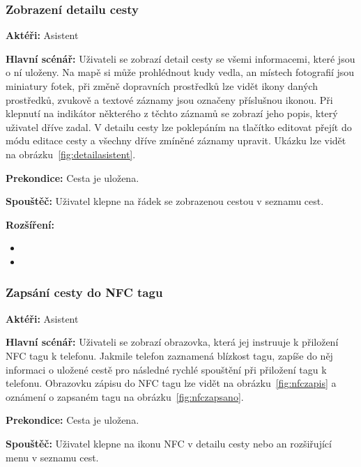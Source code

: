 \documentclass{article}
\newcommand{\usecase}[2]{\subsubsection{#1}\label{#2}}
\begin{document}
\usecase{Zobrazení detailu cesty}{detailasistent}
\textbf{Aktéři:} Asistent

\vspace{0.1cm}
\noindent
\textbf{Hlavní scénář:} Uživateli se zobrazí detail cesty se všemi informacemi, které jsou o ní uloženy.
Na mapě si může prohlédnout kudy vedla, an místech fotografií jsou miniatury fotek, při změně dopravních
prostředků lze vidět ikony daných prostředků, zvukově a textové záznamy jsou označeny příslušnou ikonou.
Při klepnutí na indikátor některého z těchto záznamů se zobrazí jeho popis, který uživatel dříve zadal.
V detailu cesty lze poklepáním na tlačítko editovat přejít do módu editace cesty a všechny dříve zmíněné
záznamy upravit. Ukázku lze vidět na obrázku~\ref{fig:detailasistent}.

\vspace{0.1cm}
\noindent
\textbf{Prekondice:} Cesta je uložena.

\vspace{0.1cm}
\noindent
\textbf{Spouštěč:} Uživatel klepne na řádek se zobrazenou cestou v seznamu cest.

\vspace{0.1cm}
\noindent
\textbf{Rozšíření:}
\begin{itemize}
  \item {}
  \item {}
\end{itemize}






\usecase{Zapsání cesty do NFC tagu}{nfczapis}
\textbf{Aktéři:} Asistent

\vspace{0.1cm}
\noindent
\textbf{Hlavní scénář:} Uživateli se zobrazí
obrazovka, která jej instruuje k přiložení NFC tagu k telefonu. Jakmile telefon zaznamená blízkost tagu,
zapíše do něj informaci o uložené cestě pro následné rychlé spouštění při přiložení tagu k telefonu.
Obrazovku zápisu do NFC tagu lze vidět na obrázku~\ref{fig:nfczapis} a oznámení o zapsaném tagu
na obrázku~\ref{fig:nfczapsano}.

\vspace{0.1cm}
\noindent
\textbf{Prekondice:} Cesta je uložena.

\vspace{0.1cm}
\noindent
\textbf{Spouštěč:} Uživatel klepne na ikonu NFC v detailu cesty nebo an rozšiřující menu v seznamu cest.
\end{document}
